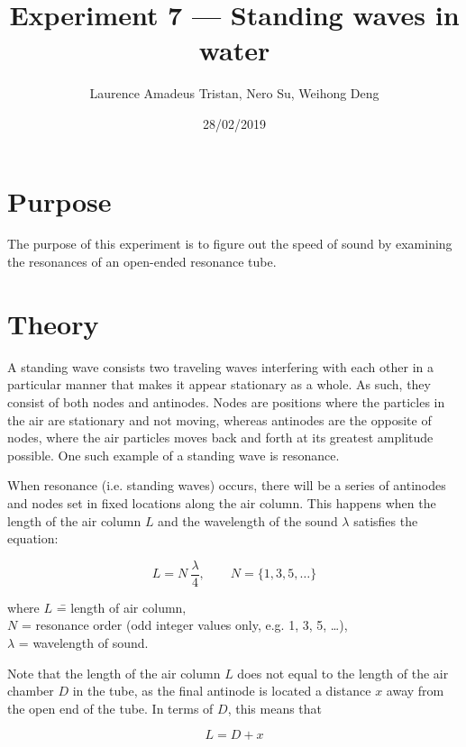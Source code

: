 \documentclass[letter]{article}
\title{Experiment 7 — Standing waves in water}
\author{Laurence Amadeus Tristan, Nero Su, Weihong Deng}
\date{28/02/2019}
\numberwithin{equation}{section}
\numberwithin{figure}{section}
\numberwithin{table}{section}
\begin{document}
\maketitle

\section{Purpose}
The purpose of this experiment is to figure out the speed of sound by examining the resonances of an open-ended resonance tube.

\section{Theory}
A standing wave consists two traveling waves interfering with each other in a particular manner that makes it appear stationary as a whole. As such, they consist of both nodes and antinodes. Nodes are positions where the particles in the air are stationary and not moving, whereas antinodes are the opposite of nodes, where the air particles moves back and forth at its greatest amplitude possible. One such example of a standing wave is resonance.

When resonance (i.e. standing waves) occurs, there will be a series of antinodes and nodes set in fixed locations along the air column.  This happens when the length of the air column \(L\) and the wavelength of the sound \(\lambda\) satisfies the equation:

\begin{equation} \label{eq:t1}
  L = N \ \frac{\lambda}{4}, \qquad N = \{1, 3, 5, \ldots\}
\end{equation}

\begin{tabbing}
  where \= \(L\) \= = length of air column, \\
  \> \(N\) \> = resonance order (odd integer values only, e.g. 1, 3, 5, \ldots), \\
  \> \(\lambda\) \> = wavelength of sound.
\end{tabbing}

Note that the length of the air column \(L\) does not equal to the length of the air chamber \(D\) in the tube, as the final antinode is located a distance \(x\) away from the open end of the tube. In terms of \(D\), this means that

\begin{equation} \label{eq:t2}
  L = D + x
\end{equation}
\end{document}
